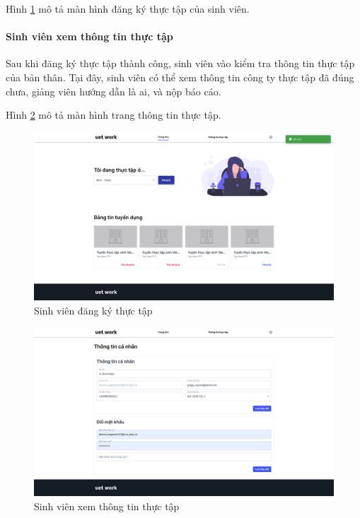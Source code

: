 \documentclass[./../main.tex]{subfiles}
\begin{document}
Hình \ref{fig:student_page} mô tả màn hình đăng ký thực tập của sinh viên.

\paragraph*{Sinh viên xem thông tin thực tập}
Sau khi đăng ký thực tập thành công, sinh viên vào kiểm tra thông tin thực tập của bản thân. Tại đây, sinh viên có thể xem thông tin công ty thực tập đã đúng chưa,  giảng viên hướng dẫn là ai, và nộp báo cáo.

Hình \ref{fig:view_internship_page} mô tả màn hình trang thông tin thực tập.

\begin{figure}[]
	\includegraphics[width=\linewidth]{./images/image15.png}
	\caption{Sinh viên đăng ký thực tập}
	\label{fig:student_page}
\end{figure}

\begin{figure}[]
	\includegraphics[width=\linewidth]{./images/image16.png}
	\caption{Sinh viên xem thông tin thực tập}
	\label{fig:view_internship_page}
\end{figure}
\end{document}
